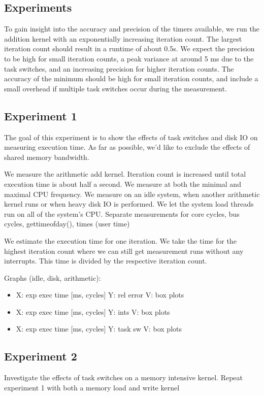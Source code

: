 \documentclass[a4paper,12pt]{article}
\begin{document}
\subsection{Experiments}
To gain insight into the accuracy and precision of the timers available, we run
the addition kernel with an exponentially increasing iteration count. The
largest iteration count should result in a runtime of about 0.5s. We expect the
precision to be high for small iteration counts, a peak variance at around 5 ms
due to the task switches, and an increasing precision for higher iteration
counts. The accuracy of the minimum should be high for small iteration counts,
and include a small overhead if multiple task switches occur during the
measurement.

\subsection{Experiment 1}
The goal of this experiment is to show the effects of task switches and disk IO
on measuring execution time. As far as possible, we'd like to exclude the
effects of shared memory bandwidth. 

We measure the arithmetic add kernel. Iteration count is increased until total
execution time is about half a second. We measure at both the minimal and
maximal CPU frequency. We measure on an idle system, when another arithmetic
kernel runs or when heavy disk IO is performed. We let the system load threads
run on all of the system's CPU. Separate measurements for core cycles, bus
cycles, gettimeofday(), times (user time)

We estimate the execution time for one iteration. We take the time for the
highest iteration count where we can still get measurement runs without any
interrupts. This time is divided by the respective iteration count.

Graphs (idle, disk, arithmetic): 

\begin{itemize}
\item X: exp exec time [ms, cycles] Y: rel error V: box plots
\item X: exp exec time [ms, cycles] Y: ints V: box plots
\item X: exp exec time [ms, cycles] Y: task sw V: box plots
\end{itemize}

\subsection{Experiment 2}
Investigate the effects of task switches on a memory intensive kernel. Repeat
experiment 1 with both a memory load and write kernel
\end{document}
